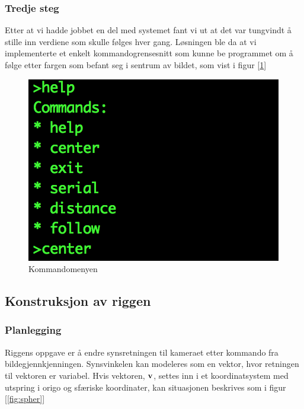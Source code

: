 \subsubsection{Tredje steg}

Etter at vi hadde jobbet en del med systemet fant vi ut at det var tungvindt å stille inn verdiene som skulle følges hver gang. Løsningen ble da at vi implementerte et enkelt kommandogrensesnitt som kunne be programmet om å følge etter fargen som befant seg i sentrum av bildet, som vist i figur [\ref{fig:commandmenu}]

\begin{figure}[h!]
	\centering
	\includegraphics[scale=0.8]{img/command-menu.png}
	\caption{Kommandomenyen}
	\label{fig:commandmenu}
\end{figure}

\subsection{Konstruksjon av riggen}

\subsubsection{Planlegging}
Riggens oppgave er å endre synsretningen til kameraet etter kommando fra bildegjennkjenningen. Synsvinkelen kan modeleres som en vektor, hvor retningen til vektoren er variabel. Hvis vektoren, $\bf{v}$, settes inn i et koordinatsystem med utspring i origo og sfæriske koordinater, kan situasjonen beskrives som i figur [\ref{fig:spher}]


